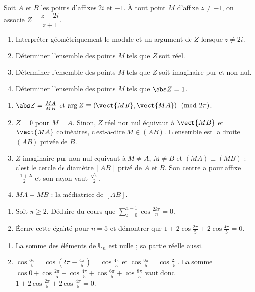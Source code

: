 \begin{exercise}
Soit $A$ et $B$ les points d'affixes $2i$ et $-1$. À tout point $M$ d'affixe $z\neq-1$, on associe $Z=\dfrac{z-2i}{z+1}$.
\begin{enumerate}
\item Interpréter géométriquement le module et un argument de $Z$ lorsque $z\neq2i$.
\item Déterminer l'ensemble des points $M$ tels que $Z$ soit réel.
\item Déterminer l'ensemble des points $M$ tels que $Z$ soit imaginaire pur et non nul.
\item Déterminer l'ensemble des points $M$ tels que $\abs Z=1$.
\end{enumerate}
\end{exercise}
\begin{solution}
\begin{enumerate}
\item $\abs Z=\frac{MA}{MB}$ et $\arg Z\equiv\left(\vect{MB},\vect{MA}\right)\pmod{2\pi}$.
\item $Z=0$ pour $M=A$. Sinon, $Z$ réel non nul équivaut à $\vect{MB}$ et $\vect{MA}$ colinéaires, c'est-à-dire $M\in(AB)$. L'ensemble est la droite $(AB)$ privée de $B$.
\item $Z$ imaginaire pur non nul équivaut à $M\neq A$, $M\neq B$ et $(MA)\perp(MB)$ : c'est le cercle de diamètre $[AB]$ privé de $A$ et $B$. Son centre a pour affixe $\frac{-1+2i}2$ et son rayon vaut $\frac{\sqrt5}2$.
\item $MA=MB$ : la médiatrice de $[AB]$.
\end{enumerate}
\end{solution}

\begin{exercise}
\begin{enumerate}
\item Soit $n\ge2$. Déduire du cours que $\displaystyle\sum_{k=0}^{n-1}\cos\frac{2k\pi}n=0$.
\item Écrire cette égalité pour $n=5$ et démontrer que $1+2\cos\frac{2\pi}5+2\cos\frac{4\pi}5=0$.
\end{enumerate}
\end{exercise}
\begin{solution}
\begin{enumerate}
\item La somme des éléments de $\mathbb U_n$ est nulle ; sa partie réelle aussi.
\item $\cos\frac{6\pi}5=\cos\left(2\pi-\frac{4\pi}5\right)=\cos\frac{4\pi}5$ et $\cos\frac{8\pi}5=\cos\frac{2\pi}5$. La somme $\cos0+\cos\frac{2\pi}5+\cos\frac{4\pi}5+\cos\frac{6\pi}5+\cos\frac{8\pi}5$ vaut donc $1+2\cos\frac{2\pi}5+2\cos\frac{4\pi}5=0$.
\end{enumerate}
\end{solution}

